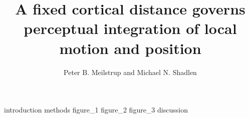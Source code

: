 \documentclass[11pt]{amsart}
\title{A fixed cortical distance governs perceptual integration of local motion and position}
\author{Peter B. Meilstrup and Michael N. Shadlen}
\def\biblio{}
\begin{document}
\maketitle

\def\biblio{}

{introduction}
{methods}
{figure_1}
{figure_2}
{figure_3}
{discussion}




\end{document}
